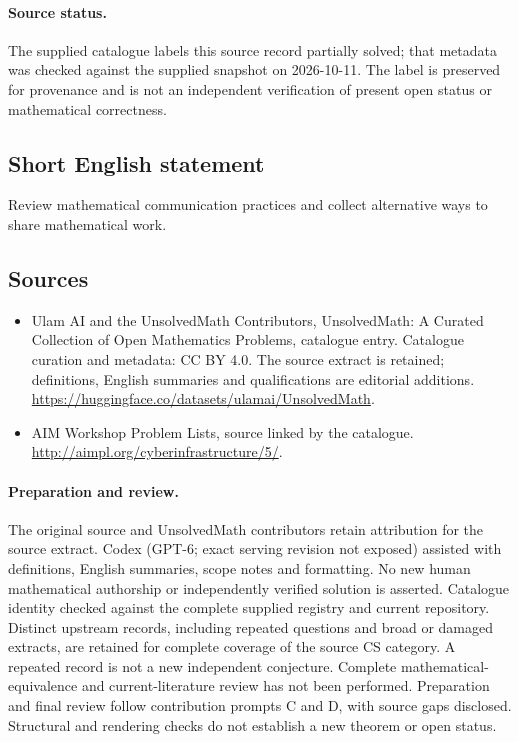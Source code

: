 \documentclass[11pt]{article}
\begin{document}
\paragraph{Source status.}
The supplied catalogue labels this source record partially solved; that metadata was checked against the supplied snapshot on 2026-10-11. The label is preserved for provenance and is not an independent verification of present open status or mathematical correctness.
\subsection{Short English statement}
Review mathematical communication practices and collect alternative ways to share mathematical work.
\subsection{Sources}
\begin{itemize}
\item[\hypertarget{source:statement:1}{S1}] Ulam AI and the UnsolvedMath Contributors, UnsolvedMath: A Curated Collection of Open Mathematics Problems, catalogue entry. Catalogue curation and metadata: CC BY 4.0. The source extract is retained; definitions, English summaries and qualifications are editorial additions.
\url{https://huggingface.co/datasets/ulamai/UnsolvedMath}.
\item[\hypertarget{source:statement:2}{S2}] AIM Workshop Problem Lists, source linked by the catalogue.
\url{http://aimpl.org/cyberinfrastructure/5/}.
\end{itemize}
\paragraph{Preparation and review.}
The original source and UnsolvedMath contributors retain attribution for the source extract. Codex (GPT-6; exact serving revision not exposed) assisted with definitions, English summaries, scope notes and formatting. No new human mathematical authorship or independently verified solution is asserted. Catalogue identity checked against the complete supplied registry and current repository. Distinct upstream records, including repeated questions and broad or damaged extracts, are retained for complete coverage of the source CS category. A repeated record is not a new independent conjecture. Complete mathematical-equivalence and current-literature review has not been performed. Preparation and final review follow contribution prompts C and D, with source gaps disclosed. Structural and rendering checks do not establish a new theorem or open status.
\label{end:statement}
\end{document}
